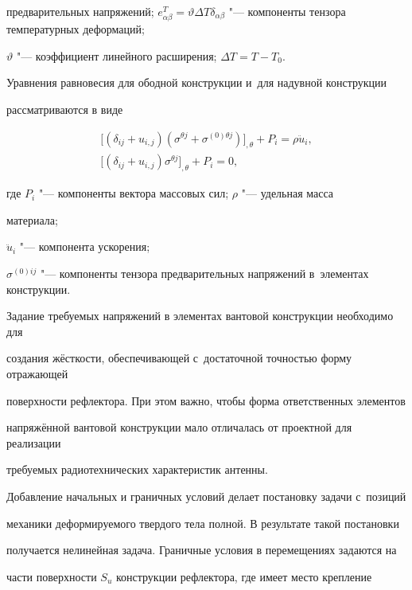 предварительных напряжений; $e_{\alpha \beta }^T =\vartheta \Delta T\delta 

_{\alpha \beta } $ "--- компоненты тензора температурных деформаций; 

$\vartheta $ "--- коэффициент линейного расширения; $\Delta T=T-T_0 $. 



Уравнения равновесия для ободной конструкции  и~для надувной конструкции 

рассматриваются в виде

\begin{gather*}

\label{belkov:eq3*}

\bigl[(\delta _{ij} +u_{i,j} )(\sigma^{\theta j}+\sigma ^{(0)\theta j})\bigr]_{,\theta }

+P_i =\rho \ddot u_i ,

\\

\bigl[(\delta _{ij}+u_{i,j})\sigma ^{\theta j}\bigr]_{,\theta}+P_{i}=0,

\end{gather*}

где $P_i $ "--- компоненты вектора массовых сил; $\rho $ "--- удельная масса 

материала;

$\ddot {u}_i $ "--- компонента ускорения; 

$\sigma ^{(0)ij}$ "--- компоненты тензора предварительных напряжений в~элементах конструкции. 

Задание требуемых напряжений в элементах вантовой конструкции необходимо для 

создания жёсткости, обеспечивающей с~достаточной точностью форму отражающей 

поверхности рефлектора. При этом важно, чтобы форма ответственных элементов 

напряжённой вантовой конструкции мало отличалась от проектной для реализации 

требуемых радиотехнических характеристик антенны. 



Добавление начальных и граничных условий делает постановку задачи с~позиций 

механики деформируемого твердого тела полной. В результате такой постановки 

получается нелинейная задача. Граничные условия в перемещениях задаются на 

части поверхности $S_{u}$ конструкции рефлектора, где имеет место крепление 

